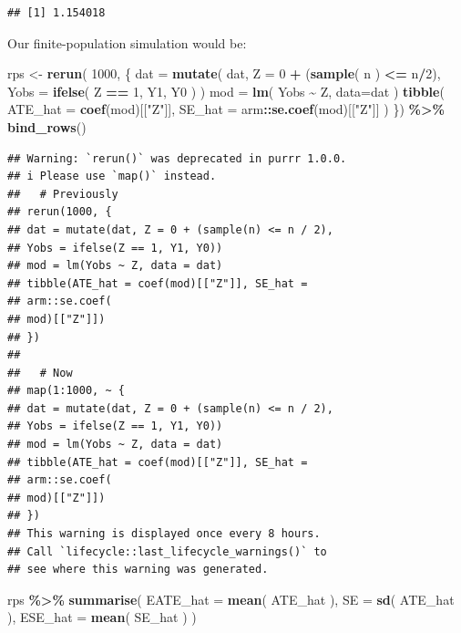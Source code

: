 \documentclass[
]{book}
\newenvironment{Shaded}{\begin{snugshade}}{\end{snugshade}}
\newcommand{\AttributeTok}[1]{\textcolor[rgb]{0.13,0.29,0.53}{#1}}
\newcommand{\DecValTok}[1]{\textcolor[rgb]{0.00,0.00,0.81}{#1}}
\newcommand{\FunctionTok}[1]{\textcolor[rgb]{0.13,0.29,0.53}{\textbf{#1}}}
\newcommand{\NormalTok}[1]{#1}
\newcommand{\OtherTok}[1]{\textcolor[rgb]{0.56,0.35,0.01}{#1}}
\newcommand{\SpecialCharTok}[1]{\textcolor[rgb]{0.81,0.36,0.00}{\textbf{#1}}}
\newcommand{\StringTok}[1]{\textcolor[rgb]{0.31,0.60,0.02}{#1}}
\begin{document}
\begin{verbatim}
## [1] 1.154018
\end{verbatim}

Our finite-population simulation would be:

\begin{Shaded}
\begin{Highlighting}[]
\NormalTok{rps }\OtherTok{\textless{}{-}} \FunctionTok{rerun}\NormalTok{( }\DecValTok{1000}\NormalTok{, \{}
\NormalTok{  dat }\OtherTok{=} \FunctionTok{mutate}\NormalTok{( dat,}
              \AttributeTok{Z =} \DecValTok{0} \SpecialCharTok{+}\NormalTok{ (}\FunctionTok{sample}\NormalTok{( n ) }\SpecialCharTok{\textless{}=}\NormalTok{ n}\SpecialCharTok{/}\DecValTok{2}\NormalTok{),}
              \AttributeTok{Yobs =} \FunctionTok{ifelse}\NormalTok{( Z }\SpecialCharTok{==} \DecValTok{1}\NormalTok{, Y1, Y0 ) )}
\NormalTok{  mod }\OtherTok{=} \FunctionTok{lm}\NormalTok{( Yobs }\SpecialCharTok{\textasciitilde{}}\NormalTok{ Z, }\AttributeTok{data=}\NormalTok{dat )}
  \FunctionTok{tibble}\NormalTok{( }\AttributeTok{ATE\_hat =} \FunctionTok{coef}\NormalTok{(mod)[[}\StringTok{"Z"}\NormalTok{]],}
          \AttributeTok{SE\_hat =}\NormalTok{ arm}\SpecialCharTok{::}\FunctionTok{se.coef}\NormalTok{(mod)[[}\StringTok{"Z"}\NormalTok{]] )}
\NormalTok{  \}) }\SpecialCharTok{\%\textgreater{}\%}
  \FunctionTok{bind\_rows}\NormalTok{()}
\end{Highlighting}
\end{Shaded}

\begin{verbatim}
## Warning: `rerun()` was deprecated in purrr 1.0.0.
## i Please use `map()` instead.
##   # Previously
## rerun(1000, {
## dat = mutate(dat, Z = 0 + (sample(n) <= n / 2),
## Yobs = ifelse(Z == 1, Y1, Y0))
## mod = lm(Yobs ~ Z, data = dat)
## tibble(ATE_hat = coef(mod)[["Z"]], SE_hat =
## arm::se.coef(
## mod)[["Z"]])
## })
## 
##   # Now
## map(1:1000, ~ {
## dat = mutate(dat, Z = 0 + (sample(n) <= n / 2),
## Yobs = ifelse(Z == 1, Y1, Y0))
## mod = lm(Yobs ~ Z, data = dat)
## tibble(ATE_hat = coef(mod)[["Z"]], SE_hat =
## arm::se.coef(
## mod)[["Z"]])
## })
## This warning is displayed once every 8 hours.
## Call `lifecycle::last_lifecycle_warnings()` to
## see where this warning was generated.
\end{verbatim}

\begin{Shaded}
\begin{Highlighting}[]
\NormalTok{rps }\SpecialCharTok{\%\textgreater{}\%} \FunctionTok{summarise}\NormalTok{( }\AttributeTok{EATE\_hat =} \FunctionTok{mean}\NormalTok{( ATE\_hat ),}
                   \AttributeTok{SE =} \FunctionTok{sd}\NormalTok{( ATE\_hat ),}
                   \AttributeTok{ESE\_hat =} \FunctionTok{mean}\NormalTok{( SE\_hat ) )}
\end{Highlighting}
\end{Shaded}
\end{document}
